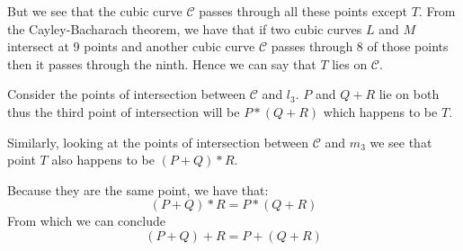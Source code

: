 \documentclass{report}
\begin{document}
  But we see that the cubic curve $\mathcal{C}$ passes through all these points except $T$.
  From the Cayley-Bacharach theorem, we have that if two cubic curves $L$ and $M$ intersect at 9 points and another cubic curve $\mathcal{C}$ passes through 8 of those points then it passes through the ninth.
  Hence we can say that $T$ lies on $\mathcal{C}$.
  
  \noindent
  Consider the points of intersection between $\mathcal{C}$ and $l_3$.
  $P$ and $Q+R$ lie on both thus the third point of intersection will be $P*(Q+R)$ which happens to be $T$.

  \noindent
  Similarly, looking at the  points of intersection between $\mathcal{C}$ and $m_3$ we see that point $T$ also happens to be $(P+Q)*R$.

  \noindent
  Because they are the same point, we have that:
  \[(P+Q)*R = P*(Q+R)\]
  From which we can conclude
  \[(P+Q)+R = P+(Q+R)\]
\end{document}
